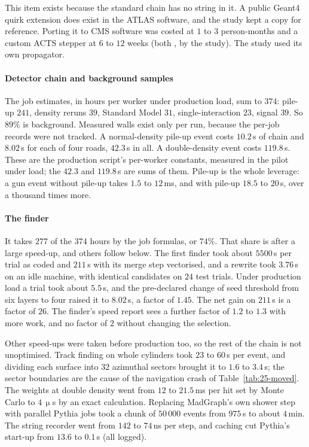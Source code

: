This item exists because the standard chain has no string in it. A public Geant4 quirk extension does exist in the ATLAS software, and the study kept a copy for reference. Porting it to CMS software was costed at $1$ to $3$ person-months and a custom ACTS stepper at $6$ to $12$ weeks (both \EST, by the study). The study used its own propagator.

\paragraph{Detector chain and background samples}
The job estimates, in hours per worker under production load, sum to $374$: pile-up $241$, density reruns $39$, Standard Model $31$, single-interaction $23$, signal $39$. So $89\%$ is background. Measured walls exist only per run, because the per-job records were not tracked. A normal-density pile-up event costs $10.2$\,s of chain and $8.02$\,s for each of four roads, $42.3$\,s in all. A double-density event costs $119.8$\,s. These are the production script's per-worker constants, measured in the pilot under load; the $42.3$ and $119.8$\,s are sums of them. Pile-up is the whole leverage: a gun event without pile-up takes $1.5$ to $12$\,ms, and with pile-up $18.5$ to $20$\,s, over a thousand times more.

\paragraph{The finder}
It takes $277$ of the $374$ hours by the job formulas, or $74\%$. That share is after a large speed-up, and others follow below. The first finder took about $5500$\,s per trial as coded and $211$\,s with its merge step vectorised, and a rewrite took $3.76$\,s on an idle machine, with identical candidates on $24$ test trials. Under production load a trial took about $5.5$\,s, and the pre-declared change of seed threshold from six layers to four raised it to $8.02$\,s, a factor of $1.45$. The net gain on $211$\,s is a factor of $26$. The finder's speed report sees a further factor of $1.2$ to $1.3$ with more work, and no factor of $2$ without changing the selection.

Other speed-ups were taken before production too, so the rest of the chain is not unoptimised. Track finding on whole cylinders took $23$ to $60$\,s per event, and dividing each surface into $32$ azimuthal sectors brought it to $1.6$ to $3.4$\,s; the sector boundaries are the cause of the navigation crash of Table~\ref{tab:25-moved}. The weights at double density went from $12$ to $21.5$\,ms per hit set by Monte Carlo to $4\,\upmu$s by an exact calculation. Replacing MadGraph's own shower step with parallel Pythia jobs took a chunk of $50\,000$ events from $975$\,s to about $4$\,min. The string recorder went from $142$ to $74$\,ns per step, and caching cut Pythia's start-up from $13.6$ to $0.1$\,s (all logged).

